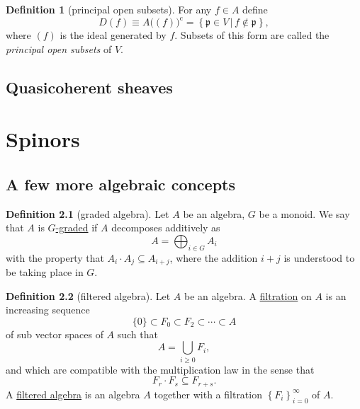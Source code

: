 \documentclass[a4paper]{report}
\newcommand{\defn}[1]{\ul{#1}}
\theoremstyle{definition}
\newtheorem{definition}{Definition}[section]
\theoremstyle{plain}
\theoremstyle{remark}
\begin{document}
\begin{definition}[principal open subsets]
  \label{def:principalopensubsets}
  For any $f \in A$ define 
  \begin{equation*}
    D(f) \equiv A\big((f)\big)^{\mathrm{c}} = \left\{ \mathfrak{p} \in V\,\big|\, f \notin \mathfrak{p} \right\},
  \end{equation*}
  where $(f)$ is the ideal generated by $f$. Subsets of this form are called the \emph{principal open subsets} of $V$.
\end{definition}



\section{Quasicoherent sheaves} \label{sec:quasicoherentsheaves}

\chapter{Spinors} 
\section{A few more algebraic concepts}
\begin{definition}[graded algebra]
  \label{def:gradedalgebra}
  Let $A$ be an algebra, $G$ be a monoid. We say that $A$ is \defn{$G$-graded} if $A$ decomposes additively as  \begin{equation*}
    A = \bigoplus_{i \in G} A_{i}
  \end{equation*}
  with the property that $A_{i} \cdot A_{j} \subseteq A_{i+j}$, where the addition $i+j$ is understood to be taking place in $G$.
\end{definition}

\begin{definition}[filtered algebra]
  \label{def:filteredalgebra}
  Let $A$ be an algebra. A \defn{filtration} on $A$ is an increasing sequence 
  \begin{equation*}
    \{0\} \subset F_{0} \subset F_{2} \subset \cdots \subset A
  \end{equation*}
  of sub vector spaces of $A$ such that
  \begin{equation*}
    A = \bigcup_{i\geq 0} F_{i},
  \end{equation*}
  and which are compatible with the multiplication law in the sense that
  \begin{equation*}
    F_{r} \cdot F_{s} \subseteq F_{r+s}.
  \end{equation*}
  A \defn{filtered algebra} is an algebra $A$ together with a filtration $\left\{ F_{i} \right\}_{i=0}^{\infty}$ of $A$.
\end{definition}
\end{document}
